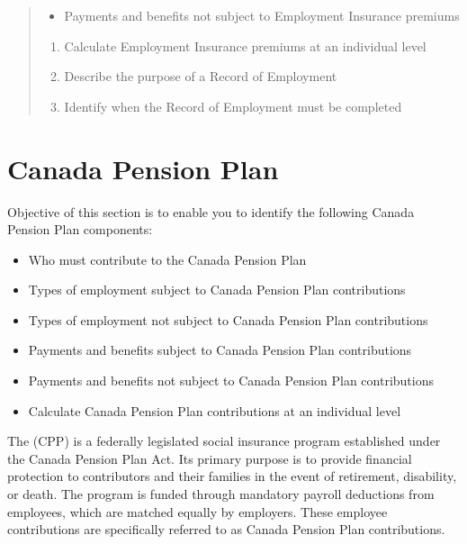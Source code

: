 \documentclass[letterpaper,10pt,english]{sphinxmanual}
\begin{document}
\begin{quote}
\begin{itemize}
\item {} 
\sphinxAtStartPar
Payments and benefits not subject to Employment Insurance premiums

\end{itemize}
\begin{enumerate}
%
\setcounter{enumi}{3}
\item {} 
\sphinxAtStartPar
Calculate Employment Insurance premiums at an individual level

\item {} 
\sphinxAtStartPar
Describe the purpose of a Record of Employment

\item {} 
\sphinxAtStartPar
Identify when the Record of Employment must be completed

\end{enumerate}
\end{quote}


\chapter{Canada Pension Plan}
\label{\detokenize{cpp-and-ei:canada-pension-plan}}\label{\detokenize{cpp-and-ei::doc}}
\sphinxAtStartPar
Objective of this section is to enable you to identify the following Canada Pension Plan components:
\begin{itemize}
\item {} 
\sphinxAtStartPar
Who must contribute to the Canada Pension Plan

\item {} 
\sphinxAtStartPar
Types of employment subject to Canada Pension Plan contributions

\item {} 
\sphinxAtStartPar
Types of employment not subject to Canada Pension Plan contributions

\item {} 
\sphinxAtStartPar
Payments and benefits subject to Canada Pension Plan contributions

\item {} 
\sphinxAtStartPar
Payments and benefits not subject to Canada Pension Plan contributions

\item {} 
\sphinxAtStartPar
Calculate Canada Pension Plan contributions at an individual level

\end{itemize}

\sphinxAtStartPar
The  (CPP) is a federally legislated social insurance program established under the Canada Pension Plan
Act. Its primary purpose is to provide financial protection to contributors and their families in the event of retirement,
disability, or death. The program is funded through mandatory payroll deductions from employees, which are matched equally by
employers. These employee contributions are specifically referred to as Canada Pension Plan contributions.
\end{document}
